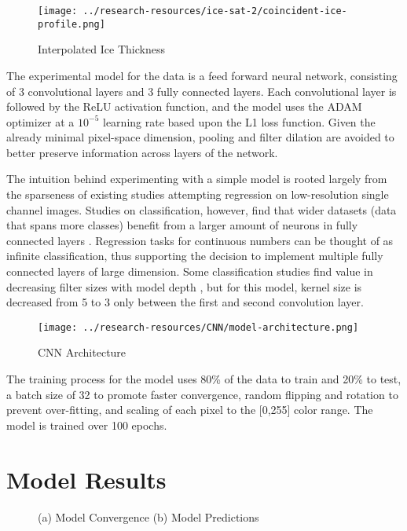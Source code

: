 \begin{figure}[h!]
	\centering
	\texttt{[image: ../research-resources/ice-sat-2/coincident-ice-profile.png]}
	\caption{Interpolated Ice Thickness}
	\label{fig:ice-thickness-interpolation}
\end{figure}

The experimental model for the data is a feed forward neural network, consisting of 3 convolutional layers and 3 fully connected layers. Each convolutional layer is followed by the ReLU activation function, and the model uses the ADAM optimizer at a $10^{-5}$ learning rate based upon the L1 loss function. Given the already minimal pixel-space dimension, pooling and filter dilation are avoided to better preserve information across layers of the network.

The intuition behind experimenting with a simple model is rooted largely from the sparseness of existing studies attempting regression on low-resolution single channel images. Studies on classification, however, find that wider datasets (data that spans more classes) benefit from a larger amount of neurons in fully connected layers \cite{BASHA2020112}. Regression tasks for continuous numbers can be thought of as infinite classification, thus supporting the decision to implement multiple fully connected layers of large dimension. Some classification studies find value in decreasing filter sizes with model depth \cite{ganj2023lrnet}, but for this model, kernel size is decreased from 5 to 3 only between the first and second convolution layer.

\begin{figure}
  \centering
  \texttt{[image: ../research-resources/CNN/model-architecture.png]}
	\caption{CNN Architecture}
	\label{fig:cnn-model}
\end{figure}

The training process for the model uses 80\% of the data to train and 20\% to test, a batch size of 32 to promote faster convergence, random flipping and rotation to prevent over-fitting, and scaling of each pixel to the [0,255] color range. The model is trained over 100 epochs.


\section{Model Results}

\begin{figure}[hbt!]
	\centering
	\caption[Model Performance]{(a) Model Convergence (b) Model Predictions}
	\label{fig:model-results}
\end{figure}

